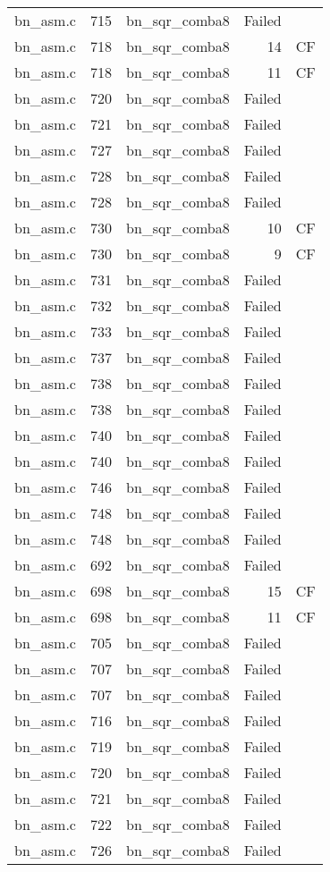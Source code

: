 \begin{table}[h]
{\begin{tabular}{clrrr}
bn\_asm.c&715&bn\_sqr\_comba8&Failed&\\
bn\_asm.c&718&bn\_sqr\_comba8&14&CF\\
bn\_asm.c&718&bn\_sqr\_comba8&11&CF\\
bn\_asm.c&720&bn\_sqr\_comba8&Failed&\\
bn\_asm.c&721&bn\_sqr\_comba8&Failed&\\
bn\_asm.c&727&bn\_sqr\_comba8&Failed&\\
bn\_asm.c&728&bn\_sqr\_comba8&Failed&\\
bn\_asm.c&728&bn\_sqr\_comba8&Failed&\\
bn\_asm.c&730&bn\_sqr\_comba8&10&CF\\
bn\_asm.c&730&bn\_sqr\_comba8&9 &CF\\
bn\_asm.c&731&bn\_sqr\_comba8&Failed&\\
bn\_asm.c&732&bn\_sqr\_comba8&Failed&\\
bn\_asm.c&733&bn\_sqr\_comba8&Failed&\\
bn\_asm.c&737&bn\_sqr\_comba8&Failed&\\
bn\_asm.c&738&bn\_sqr\_comba8&Failed&\\
bn\_asm.c&738&bn\_sqr\_comba8&Failed&\\
bn\_asm.c&740&bn\_sqr\_comba8&Failed&\\
bn\_asm.c&740&bn\_sqr\_comba8&Failed&\\
bn\_asm.c&746&bn\_sqr\_comba8&Failed&\\
bn\_asm.c&748&bn\_sqr\_comba8&Failed&\\
bn\_asm.c&748&bn\_sqr\_comba8&Failed&\\
bn\_asm.c&692&bn\_sqr\_comba8&Failed&\\
bn\_asm.c&698&bn\_sqr\_comba8&15&CF\\
bn\_asm.c&698&bn\_sqr\_comba8&11&CF\\
bn\_asm.c&705&bn\_sqr\_comba8&Failed&\\
bn\_asm.c&707&bn\_sqr\_comba8&Failed&\\
bn\_asm.c&707&bn\_sqr\_comba8&Failed&\\
bn\_asm.c&716&bn\_sqr\_comba8&Failed&\\
bn\_asm.c&719&bn\_sqr\_comba8&Failed&\\
bn\_asm.c&720&bn\_sqr\_comba8&Failed&\\
bn\_asm.c&721&bn\_sqr\_comba8&Failed&\\
bn\_asm.c&722&bn\_sqr\_comba8&Failed&\\
bn\_asm.c&726&bn\_sqr\_comba8&Failed&\\

\end{tabular}}
\end{table}
